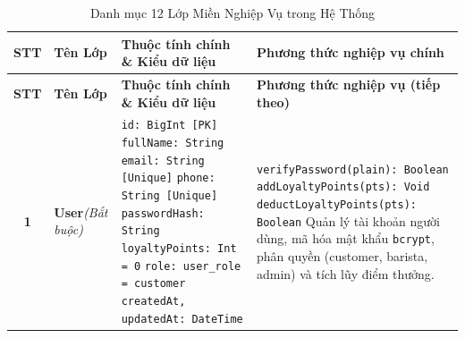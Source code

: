 \documentclass[12pt,a4paper]{article}
\begin{document}
\vspace{0.2cm}
\noindent
\footnotesize
\renewcommand{\arraystretch}{1.25}
\begin{xltabular}{\textwidth}{|c|>{\raggedright\arraybackslash}p{3.2cm}|>{\raggedright\arraybackslash}p{4.2cm}|>{\raggedright\arraybackslash}X|}
\caption{Danh mục 12 Lớp Miền Nghiệp Vụ trong Hệ Thống} \label{tab:classes} \\
\hline
{}
\textbf{STT} & \textbf{Tên Lớp} & \textbf{Thuộc tính chính \& Kiểu dữ liệu} & \textbf{Phương thức nghiệp vụ chính} \\
\hline
\endfirsthead

\hline
{}
\textbf{STT} & \textbf{Tên Lớp} & \textbf{Thuộc tính chính \& Kiểu dữ liệu} & \textbf{Phương thức nghiệp vụ (tiếp theo)} \\
\hline
\endhead

\hline
\endfoot

\hline
\endlastfoot

\textbf{1} & \textbf{User}\newline\textit{(Bắt buộc)} & 
\texttt{id: BigInt [PK]}\newline
\texttt{fullName: String}\newline
\texttt{email: String [Unique]}\newline
\texttt{phone: String [Unique]}\newline
\texttt{passwordHash: String}\newline
\texttt{loyaltyPoints: Int = 0}\newline
\texttt{role: user\_role = customer}\newline
\texttt{createdAt, updatedAt: DateTime} & 
\texttt{verifyPassword(plain): Boolean}\newline
\texttt{addLoyaltyPoints(pts): Void}\newline
\texttt{deductLoyaltyPoints(pts): Boolean}\newline
Quản lý tài khoản người dùng, mã hóa mật khẩu \texttt{bcrypt}, phân quyền (customer, barista, admin) và tích lũy điểm thưởng. \\
\hline


\end{xltabular}
\end{document}
